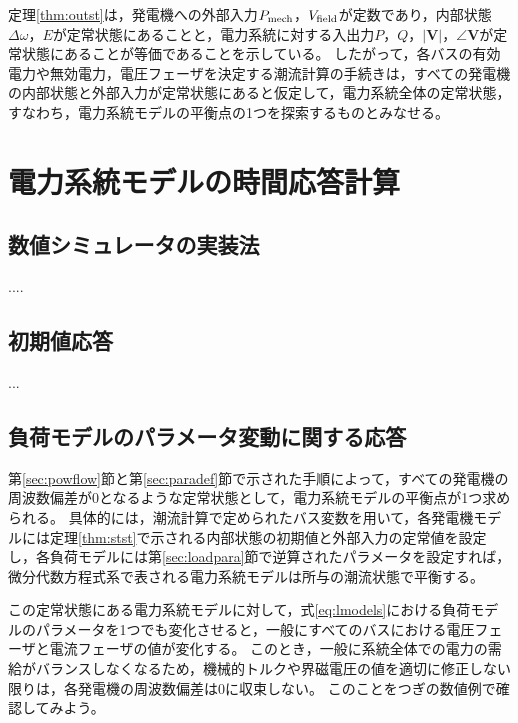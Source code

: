 \documentclass[tombow,dvipdfmx]{corona-a5}
\begin{document}
定理\ref{thm:outst}は，発電機への外部入力$P_{\rm mech}$，$V_{\rm field}$が定数であり，内部状態$\Delta \omega$，$E$が定常状態にあることと，電力系統に対する入出力$P$，$Q$，$|\bm{V}|$，$\angle \bm{V}$が定常状態にあることが等価であることを示している。
したがって，各バスの有効電力や無効電力，電圧フェーザを決定する潮流計算の手続きは，すべての発電機の内部状態と外部入力が定常状態にあると仮定して，電力系統全体の定常状態，すなわち，電力系統モデルの平衡点の1つを探索するものとみなせる。



\section{電力系統モデルの時間応答計算}

\subsection{数値シミュレータの実装法}
....

\subsection{初期値応答}
...

\subsection{負荷モデルのパラメータ変動に関する応答}\label{sec:resldpara}

第\ref{sec:powflow}節と第\ref{sec:paradef}節で示された手順によって，すべての発電機の周波数偏差が0となるような定常状態として，電力系統モデルの平衡点が1つ求められる。
具体的には，潮流計算で定められたバス変数を用いて，各発電機モデルには定理\ref{thm:stst}で示される内部状態の初期値と外部入力の定常値を設定し，各負荷モデルには第\ref{sec:loadpara}節で逆算されたパラメータを設定すれば，微分代数方程式系で表される電力系統モデルは所与の潮流状態で平衡する。

この定常状態にある電力系統モデルに対して，式\ref{eq:lmodels}における負荷モデルのパラメータを1つでも変化させると，一般にすべてのバスにおける電圧フェーザと電流フェーザの値が変化する。
このとき，一般に系統全体での電力の需給がバランスしなくなるため，機械的トルクや界磁電圧の値を適切に修正しない限りは，各発電機の周波数偏差は0に収束しない。
このことをつぎの数値例で確認してみよう。

\begin{例}[負荷モデルのパラメータを変化させたときの電力系統モデルの時間応答]\label{ex:loadpv}
\end{例}
\end{document}
